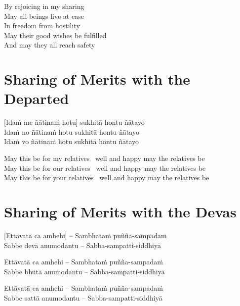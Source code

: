 \begin{english}
  By rejoicing in my sharing\\
  May all beings live at ease\\
  In freedom from hostility\\
  May their good wishes be fulfilled\\
  And may they all reach safety
\end{english}

\suttaRef{[Thai]}


\section{Sharing of Merits with the Departed}
\label{sharing-merits-departed}

[Idaṁ me ñātinaṁ hotu] sukhitā hontu ñātayo\\
Idaṁ no ñātinaṁ hotu sukhitā hontu ñātayo\\
Idaṁ vo ñātinaṁ hotu sukhitā hontu ñātayo

\begin{english}
  May this be for my relatives \breathmark\ well and happy may the relatives be\\
  May this be for our relatives \breathmark\ well and happy may the relatives be\\
  May this be for your relatives \breathmark\ well and happy may the relatives be
\end{english}

\suttaRef{[Thai]}


\section{Sharing of Merits with the Devas}
\label{sharing-merits-devas}

[Ettāvatā ca amhehi] – Sambhataṁ puñña-sampadaṁ\\
Sabbe devā anumodantu – Sabba-sampatti-siddhiyā

Ettāvatā ca amhehi – Sambhataṁ puñña-sampadaṁ\\
Sabbe bhūtā anumodantu – Sabba-sampatti-siddhiyā

Ettāvatā ca amhehi – Sambhataṁ puñña-sampadaṁ\\
Sabbe sattā anumodantu – Sabba-sampatti-siddhiyā

